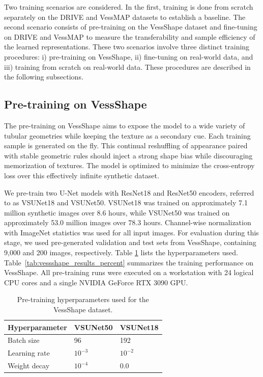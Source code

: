 \documentclass[%
reprint,
nofootinbib,
 amsmath,amssymb,
aps,
superscriptaddress,
showkeys,
longbibliography
]{revtex4-1}
\begin{document}
Two training scenarios are considered. In the first, training is done from scratch separately on the DRIVE and VessMAP datasets to establish a baseline. The second scenario consists of pre-training on the VessShape dataset and fine-tuning on DRIVE and VessMAP to measure the transferability and sample efficiency of the learned representations. These two scenarios involve three distinct training procedures: i) pre-training on VessShape, ii) fine-tuning on real-world data, and iii) training from scratch on real-world data. These procedures are described in the following subsections.

\subsection{Pre-training on VessShape}

The pre-training on VessShape aims to expose the model to a wide variety of tubular geometries while keeping the texture as a secondary cue. Each training sample is generated on the fly. This continual reshuffling of appearance paired with stable geometric rules should inject a strong shape bias while discouraging memorization of textures. The model is optimized to minimize the cross-entropy loss over this effectively infinite synthetic dataset. 

We pre-train two U-Net models with ResNet18 and ResNet50 encoders, referred to as VSUNet18 and VSUNet50. VSUNet18 was trained on approximately 7.1 million synthetic images over 8.6 hours, while VSUNet50 was trained on approximately 53.0 million images over 78.3 hours. Channel-wise normalization with ImageNet statistics was used for all input images. For evaluation during this stage, we used pre-generated validation and test sets from VessShape, containing 9,000 and 200 images, respectively. Table \ref{tab:vs_hparams} lists the hyperparameters used. Table~\ref{tab:vessshape_results_percent} summarizes the training performance on VessShape. All pre-training runs were executed on a workstation with 24 logical CPU cores and a single NVIDIA GeForce RTX 3090 GPU.

\begin{table}[t]
    \caption{Pre-training hyperparameters used for the VessShape dataset.}
    \label{tab:vs_hparams}
    \centering
    \begingroup
    \small
    \setlength{\tabcolsep}{6pt}
    \renewcommand{\arraystretch}{1.15}
    \begin{tabular}{l l l}
        \hline
        	\textbf{Hyperparameter} & \textbf{VSUNet50} & \textbf{VSUNet18} \\
        \hline
        Batch size & 96 & 192 \\
        Learning rate & $10^{-3}$ & $10^{-2}$ \\
        Weight decay & $10^{-4}$ & 0.0 \\
        \hline
    \end{tabular}
    \endgroup
\end{table}
\end{document}

